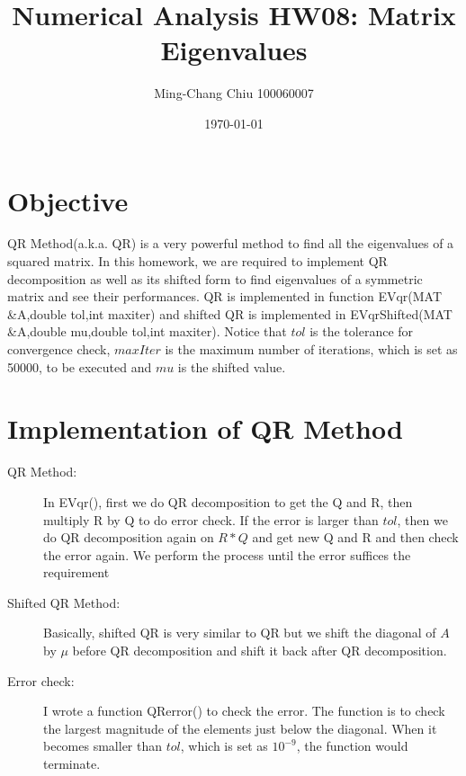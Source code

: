 \documentclass[12pt,a4paper]{article}
\title{Numerical Analysis HW08: Matrix Eigenvalues}
\author{Ming-Chang Chiu 100060007}
\date{\today}
\begin{document}
\maketitle
\fontsize{12}{20pt}\selectfont %

\section{Objective}
QR Method(a.k.a. QR) is a very powerful method to find all the eigenvalues of a squared matrix. In this homework, we are required to implement QR decomposition as well as its shifted form to find eigenvalues of a symmetric matrix and see their performances. QR is implemented in function EVqr(MAT \&A,double tol,int maxiter) and shifted QR is implemented in EVqrShifted(MAT \&A,double mu,double tol,int maxiter). Notice that $tol$ is the tolerance for convergence check, $maxIter$ is the maximum number of iterations, which is set as 50000, to be executed and $mu$ is the shifted value.


\section{Implementation of QR Method }
\begin{description}  

\item [QR Method:] In EVqr(), first we do QR decomposition to get the Q and R, then multiply R by Q to do error check. If the error is larger than $tol$, then we do QR decomposition again on $R * Q$ and get new Q and R and then check the error again. We perform the process until the error suffices the requirement

\item [Shifted QR Method:] Basically, shifted QR is very similar to QR but we shift the diagonal of $A$ by $\mu$ before QR decomposition and shift it back after QR decomposition. \\

\item [Error check:] I wrote a function QRerror() to check the error. The function is to check the largest magnitude of the elements just below the diagonal. When it becomes smaller than $tol$, which is set as $10^{-9}$, the function would terminate.\\

\end{description}
\end{document}
